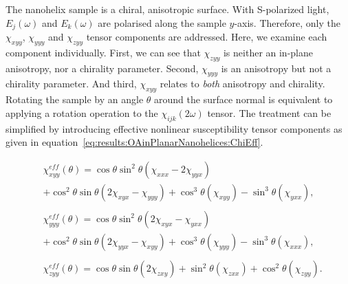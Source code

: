 The nanohelix sample is a chiral, anisotropic surface. With S-polarized light, ${E_j}(\omega)$ and ${E_k}(\omega)$ are polarised along the sample $y$-axis. Therefore, only the $\chi_{xyy}$, $\chi_{yyy}$ and $\chi_{zyy}$ tensor components are addressed. Here, we examine each component individually. 
First, we can see that $\chi_{zyy}$ is neither an in-plane anisotropy, nor a chirality parameter. Second, $\chi_{yyy}$ is an anisotropy but not a chirality parameter. And third, $\chi_{xyy}$ relates to \textit{both} anisotropy and chirality. 
Rotating the sample by an angle $\theta$ around the surface normal is equivalent to applying a rotation operation to the $\chi_{ijk}(2\omega)$ tensor. The treatment can be simplified by introducing effective nonlinear susceptibility tensor components as given in equation~\ref{eq:results:OAinPlanarNanohelices:ChiEff}.

\begin{equation}\label{eq:results:OAinPlanarNanohelices:ChiEff}
	\begin{split}
		&\chi_{xyy}^{eff}(\theta) = \cos\theta\sin^2\theta(\chi_{xxx} - 2\chi_{yyx}) \\
		&+ {\cos^2}\theta\sin\theta (2\chi _{xyx} - \chi_{yyy}) + {\cos^3}\theta(\chi_{xyy}) - {\sin^3}\theta(\chi _{yxx}), \\
		\\
		&\chi_{yyy}^{eff}(\theta) = \cos\theta\sin^2\theta(2\chi_{xyx} - \chi_{yxx}) \\
		&+ {\cos^2}\theta\sin\theta (2\chi _{yyx} - \chi_{xyy}) + {\cos^3}\theta(\chi_{yyy}) - {\sin^3}\theta(\chi _{xxx}), \\
		\\
		&\chi _{zyy}^{eff}(\theta) = \cos\theta\sin\theta (2\chi_{zxy}) + {\sin^2}\theta(\chi_{zxx}) + {\cos^2}\theta (\chi_{zyy}).
	\end{split}
\end{equation}

